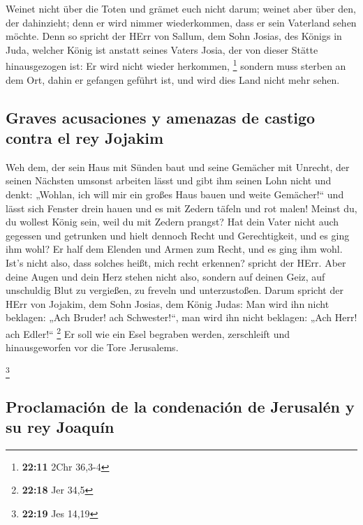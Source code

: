  Weinet nicht über die Toten und grämet euch nicht darum;
weinet aber über den, der dahinzieht; denn er wird nimmer wiederkommen,
dass er sein Vaterland sehen möchte.  Denn so spricht der
HErr von Sallum, dem Sohn Josias, des Königs in Juda, welcher König ist
anstatt seines Vaters Josia, der von dieser Stätte hinausgezogen ist: Er
wird nicht wieder herkommen, \footnote{\textbf{22:11} 2Chr 36,3-4}
 sondern muss sterben an dem Ort, dahin er gefangen
geführt ist, und wird dies Land nicht mehr sehen.

\hypertarget{graves-acusaciones-y-amenazas-de-castigo-contra-el-rey-jojakim}{%
\subsection{Graves acusaciones y amenazas de castigo contra el rey
Jojakim}\label{graves-acusaciones-y-amenazas-de-castigo-contra-el-rey-jojakim}}

 Weh dem, der sein Haus mit Sünden baut und seine
Gemächer mit Unrecht, der seinen Nächsten umsonst arbeiten lässt und
gibt ihm seinen Lohn nicht  und denkt: „Wohlan, ich will
mir ein großes Haus bauen und weite Gemächer!{}`` und lässt sich Fenster
drein hauen und es mit Zedern täfeln und rot malen! 
Meinst du, du wollest König sein, weil du mit Zedern prangst? Hat dein
Vater nicht auch gegessen und getrunken und hielt dennoch Recht und
Gerechtigkeit, und es ging ihm wohl?  Er half dem Elenden
und Armen zum Recht, und es ging ihm wohl. Ist's nicht also, dass
solches heißt, mich recht erkennen? spricht der HErr. 
Aber deine Augen und dein Herz stehen nicht also, sondern auf deinen
Geiz, auf unschuldig Blut zu vergießen, zu freveln und unterzustoßen.
 Darum spricht der HErr von Jojakim, dem Sohn Josias, dem
König Judas: Man wird ihn nicht beklagen: „Ach Bruder! ach
Schwester!{}``, man wird ihn nicht beklagen: „Ach Herr! ach Edler!{}``
\footnote{\textbf{22:18} Jer 34,5}  Er soll wie ein Esel
begraben werden, zerschleift und hinausgeworfen vor die Tore Jerusalems.

\footnote{\textbf{22:19} Jes 14,19}

\hypertarget{proclamaciuxf3n-de-la-condenaciuxf3n-de-jerusaluxe9n-y-su-rey-joaquuxedn}{%
\subsection{Proclamación de la condenación de Jerusalén y su rey
Joaquín}\label{proclamaciuxf3n-de-la-condenaciuxf3n-de-jerusaluxe9n-y-su-rey-joaquuxedn}}

